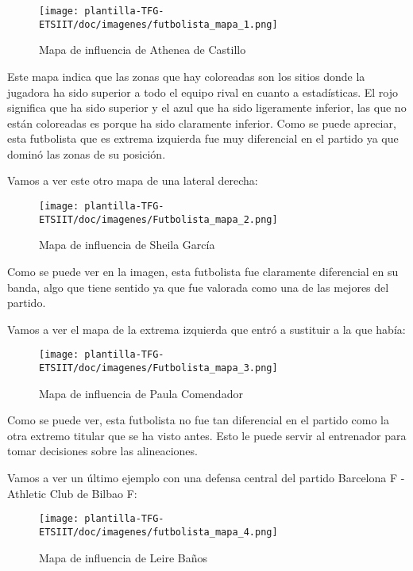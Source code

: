 \begin{figure}[H]
    \centering
    \texttt{[image: plantilla-TFG-ETSIIT/doc/imagenes/futbolista\_mapa\_1.png]}
    \caption{Mapa de influencia de Athenea de Castillo}
    \label{fig:etiqueta-imagen}
\end{figure}

Este mapa indica que las zonas que hay coloreadas son los sitios donde la jugadora ha sido superior a todo el equipo rival en cuanto a estadísticas. El rojo significa que ha sido superior y el azul que ha sido ligeramente inferior, las que no están coloreadas es porque ha sido claramente inferior. Como se puede apreciar, esta futbolista que es extrema izquierda fue muy diferencial en el partido ya que dominó las zonas de su posición.

Vamos a ver este otro mapa de una lateral derecha:

\begin{figure}[H]
    \centering
    \texttt{[image: plantilla-TFG-ETSIIT/doc/imagenes/Futbolista\_mapa\_2.png]}
    \caption{Mapa de influencia de Sheila García}
    \label{fig:etiqueta-imagen}
\end{figure}

Como se puede ver en la imagen, esta futbolista fue claramente diferencial en su banda, algo que tiene sentido ya que fue valorada como una de las mejores del partido.

Vamos a ver el mapa de la extrema izquierda que entró a sustituir a la que había:

\begin{figure}[H]
    \centering
    \texttt{[image: plantilla-TFG-ETSIIT/doc/imagenes/Futbolista\_mapa\_3.png]}
    \caption{Mapa de influencia de Paula Comendador}
    \label{fig:etiqueta-imagen}
\end{figure}

Como se puede ver, esta futbolista no fue tan diferencial en el partido como la otra extremo titular que se ha visto antes. Esto le puede servir al entrenador para tomar decisiones sobre las alineaciones.

Vamos a ver un último ejemplo con una defensa central del partido Barcelona F - Athletic Club de Bilbao F:

\begin{figure}[H]
    \centering
    \texttt{[image: plantilla-TFG-ETSIIT/doc/imagenes/futbolista\_mapa\_4.png]}
    \caption{Mapa de influencia de Leire Baños}
    \label{fig:etiqueta-imagen}
\end{figure}

